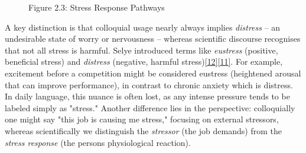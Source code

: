 \documentclass[12pt,a4paper]{article}
\begin{document}
\begin{figure}
\centering
{}
\caption{Figure 2.3: Stress Response Pathways}
\end{figure}

A key distinction is that colloquial usage nearly always implies \emph{distress} -- an undesirable state of worry or nervousness -- whereas scientific discourse recognises that not all stress is harmful. Selye introduced terms like \emph{eustress} (positive, beneficial stress) and \emph{distress} (negative, harmful stress)\href{Selye1974}{{[}12{]}}\href{Selye1956}{{[}11{]}}. For example, excitement before a competition might be considered eustress (heightened arousal that can improve performance), in contrast to chronic anxiety which is distress. In daily language, this nuance is often lost, as any intense pressure tends to be labeled simply as "stress." Another difference lies in the perspective: colloquially one might say "this job is causing me stress," focusing on external stressors, whereas scientifically we distinguish the \emph{stressor} (the job demands) from the \emph{stress response} (the person\textquotesingle s physiological reaction).
\end{document}
